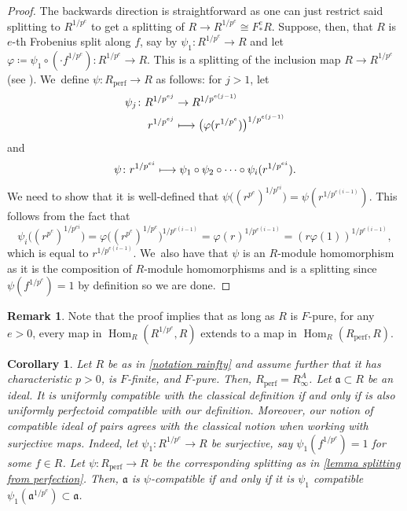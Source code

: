 \documentclass[JEP,XML,SOM,Unicode,published]{cedram}
\let\autoref\cref
\newcommand\mto{\mathchoice{\longmapsto}{\mapsto}{\mapsto}{\mapsto}}
\theoremstyle{plain}
\newtheorem{corollary}[theorem]{Corollary}
\theoremstyle{definition}
\newtheorem{remark}[theorem]{Remark}
\numberwithin{equation}{theorem}
\newcommand{\fra}{\mathfrak{a}}
\DeclareMathOperator{\Hom}{Hom}
\newcommand{\perf}{_{\mathrm{perf}}}
\newcommand{\unpe}{{1/{p^e}}}
\newcommand{\fe}{F^e}
\newcommand{\fstare}{\fe_*}
\renewcommand{\phi}{\varphi}
\newcommand{\rafty}{R^A_\infty}
\begin{document}
\begin{proof}
The backwards direction is straightforward as one can just restrict said splitting to $R^\unpe$ to get a splitting of $R\to R^\unpe\cong \fstare R$. Suppose, then, that $R$ is $e$-th Frobenius split along $f$, say by $\psi_1\colon R^\unpe\to R$ and let $\phi\coloneqq\psi_1\circ \left(\cdot f^\unpe\right)\colon R^\unpe\to R$. This is a splitting of the inclusion map $R\to R^\unpe$ (see \eg \cite[Prop.\,1.4.6]{SchwedeSmithFSingularitiesBook}). We~define $\psi\colon R\perf\to R$ as follows: for $j>1$, let
\begin{align*}
\psi_j \colon R^{1/p^{ej}} &\to R^{1/p^{e(j-1)}} \\
r^{1/p^{ej}} &\mto \bigl(\phi(r^\unpe)\bigr)^{1/p^{e(j-1)}}
\end{align*}
and
\[\psi \colon r^{1/p^{ei}} \mto \psi_1\circ \psi_2\circ\cdots\circ \psi_i(r^{1/p^{ei}}).
\]
We need to show that it is well-defined \ie that $\psi\bigl((r^{p^e})^{1/p^{ei}}\bigr)=\psi(r^{1/p^{e(i-1)}})$. This follows from the fact that
\[
\psi_i\bigl((r^{p^e})^{1/p^{ei}}\bigr)=\phi\bigl((r^{p^e})^{1/p^{e}}\bigr)^{1/p^{e(i-1)}}=\phi(r)^{1/p^{e(i-1)}}=(r\phi(1))^{1/p^{e(i-1)}},
\]
which is equal to $r^{1/p^{e(i-1)}}$. We~also have that $\psi$ is an $R$\nobreakdash-module homomorphism as it is the composition of $R$\nobreakdash-module homomorphisms and is a splitting since $\psi(f^\unpe)=1$ by definition so we are done.
\end{proof}
\begin{remark}
Note that the proof implies that as long as $R$ is $F$-pure, for any $e>0$, every map in $\Hom_R(R^\unpe,R)$ extends to a map in $\Hom_R(R\perf,R)$.
\end{remark}

\begin{corollary}\label{corollary equiv comp with char p}
Let $R$ be as in \autoref{notation rainfty} and assume further that it has characteristic $p>0$, is $F$-finite, and $F$-pure. Then, $R\perf=\rafty$. Let $\fra\subset R$ be an ideal. It is uniformly compatible with the classical definition if and only if is also uniformly perfectoid compatible with our definition. Moreover, our notion of compatible ideal of pairs agrees with the classical notion when working with surjective maps. Indeed,
let $\psi_1\colon R^\unpe\to R$ be surjective, say $\psi_1(f^\unpe)=1$ for some $f\in R$. Let $\psi\colon R\perf\to R$ be the corresponding splitting as in \autoref{lemma splitting from perfection}. Then, $\fra$ is $\psi$-compatible if and only if it is $\psi_1$ compatible \ie $\psi_1(\fra^\unpe)\subset \fra$.
\end{corollary}
\end{document}
